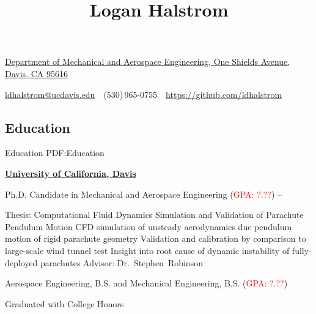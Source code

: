 \documentclass[letterpaper,MMMyyyy,nonstop]{simpleresumecv}
\newcommand{\CVAuthor}{Logan Halstrom}
\newcommand{\CVWebpage}{https://github.com/ldhalstrom}
\begin{document}

\title{\CVAuthor}

\begin{subtitle}
\href{https://www.google.com/maps/place/1+Shields+Ave,+Davis,+CA+95616}
{Department of Mechanical and Aerospace Engineering, One Shields Avenue, Davis, CA 95616}
\par
\href{mailto:ldhalstrom@ucdavis.edu}
{ldhalstrom@ucdavis.edu}
\,\SubBulletSymbol\,
(530)\,965-0755
\,\SubBulletSymbol\,
\href{\CVWebpage}
{\CVWebpage}
\end{subtitle}

\begin{body}


\section
{Education}
{Education}
{PDF:Education}

\href{http://mae.ucdavis.edu/}
{\textbf{University of California, Davis}}

\GapNoBreak
\BulletItem
Ph.D. Candidate in
{Mechanical and Aerospace Engineering} (\textcolor{red}{GPA: ?.??})
\hfill
{} --
\begin{detail}
\SubItem
Thesis:
{Computational Fluid Dynamics Simulation and Validation of Parachute Pendulum Motion}
\SubBulletItem
CFD simulation of unsteady aerodynamics due pendulum motion of rigid parachute geometry
\SubBulletItem
Validation and calibration by comparison to large-scale wind tunnel test
\SubBulletItem
Insight into root cause of dynamic instability of fully-deployed parachutes
\SubItem
Advisor:
Dr.~Stephen~Robinson
\end{detail}

\GapNoBreak
\BulletItem
Aerospace Engineering, B.S. and Mechanical Engineering, B.S. (\textcolor{red}{GPA: ?.??})
\hfill
{}
\begin{detail}
\SubBulletItem
Graduated with College Honors
\end{detail}


\end{body}
\end{document}
